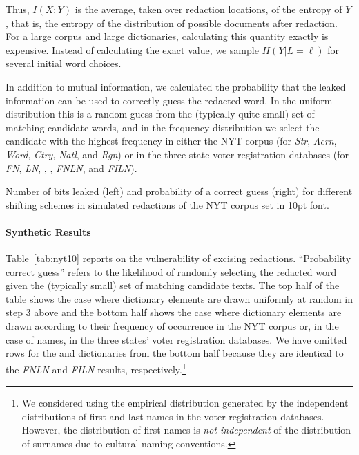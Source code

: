 Thus, $I(X;Y)$ is the average, taken over redaction locations, of the entropy of $Y$, that is, the entropy of the distribution of possible documents after redaction. 
For a large corpus and large dictionaries, calculating this quantity exactly is expensive. 
Instead of calculating the exact value, we sample $H(Y|L=\ell)$ for several initial word choices.

In addition to mutual information, we calculated the probability that the leaked information can be used to correctly guess the redacted word.
In the uniform distribution this is a random guess from the (typically quite small) set of matching candidate words, and in the frequency distribution we select the candidate with the highest frequency in either the NYT corpus (for \emph{Str}, \emph{Acrn}, \emph{Word}, \emph{Ctry}, \emph{Natl}, and \emph{Rgn}) or in the three state voter registration databases (for \emph{FN}, \emph{LN}, \emph{\fnxlnname}, \emph{\fixlnname}, \emph{FNLN}, and \emph{FILN}).

\begin{table}
\centering\small
\caption{Number of bits leaked (left) and probability of a correct guess (right) for different shifting schemes in simulated redactions of the NYT corpus set in 10pt font.
    }
\label{tab:nyt10}

\end{table}

\paragraph{Synthetic Results}
Table~\ref{tab:nyt10} reports on the vulnerability of excising redactions.
``Probability correct guess'' refers to the likelihood of randomly selecting the redacted word given the (typically small) set of matching candidate texts.
The top half of the table shows the case where dictionary elements are drawn uniformly at random in step 3 above and the bottom half shows the case where dictionary elements are drawn according to their frequency of occurrence in the NYT corpus or, in the case of names, in the three states' voter registration databases. 
We have omitted rows for the \emph{\fnxlnname} and \emph{\fixlnname} dictionaries from the bottom half because they are identical to the \emph{FNLN} and \emph{FILN} results, respectively.\footnote{
We considered using the empirical distribution generated by the independent distributions of first and last names in the voter registration databases.
However, the distribution of first names is \emph{not independent} of the distribution of surnames due to cultural naming conventions. 
}

